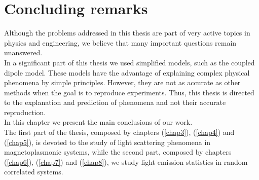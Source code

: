 \chapter{Concluding remarks\label{chap9}}


Although the problems addressed in this thesis are part of very active topics in physics and engineering, we believe that many important questions remain unanswered. \\
In a significant part of this thesis we used simplified models, such as the coupled dipole model. These models have the advantage of explaining complex physical phenomena by simple principles. However, they are not as accurate as other methods when the goal is to reproduce experiments. Thus, this thesis is directed to the explanation and prediction of phenomena and not their accurate reproduction.\\
In this chapter we present the main conclusions of our work.\\
The first part of the thesis, composed by chapters (\ref{chap3}), (\ref{chap4}) and (\ref{chap5}), is devoted to the study of light scattering phenomena in magnetoplasmonic systems, while the second part, composed by chapters (\ref{chap6}), (\ref{chap7}) and (\ref{chap8}), we study light emission statistics in random correlated systems.\\

